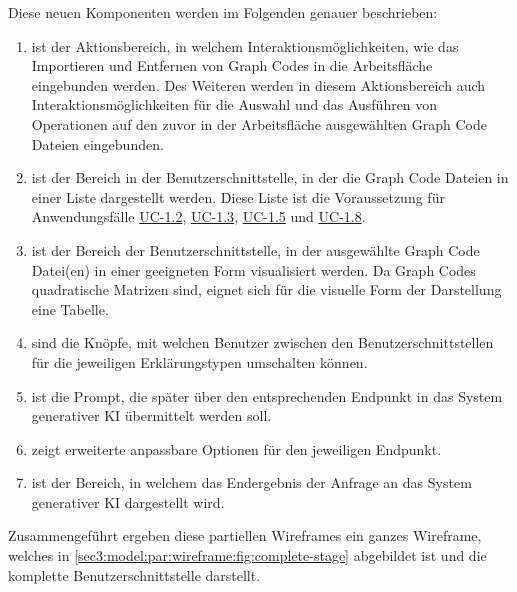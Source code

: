 Diese neuen Komponenten werden im Folgenden genauer beschrieben:
\begin{enumerate}
    \item[\circitem{4}] ist der Aktionsbereich, in welchem Interaktionsmöglichkeiten, wie das Importieren und Entfernen von Graph Codes in die Arbeitsfläche eingebunden werden.
    Des Weiteren werden in diesem Aktionsbereich auch Interaktionsmöglichkeiten für die Auswahl und das Ausführen von Operationen auf den zuvor in der Arbeitsfläche ausgewählten Graph Code Dateien eingebunden.
    \item[\circitem{5}] ist der Bereich in der Benutzerschnittstelle, in der die Graph Code Dateien in einer Liste dargestellt werden.
    Diese Liste ist die Voraussetzung für Anwendungsfälle \hyperref[sec3:model:uc-1.2]{UC-1.2}, \hyperref[sec3:model:uc-1.3]{UC-1.3}, \hyperref[sec3:model:uc-1.5]{UC-1.5} und \hyperref[sec3:model:uc-1.8]{UC-1.8}.
    \item[\circitem{6}] ist der Bereich der Benutzerschnittstelle, in der ausgewählte Graph Code Datei(en) in einer geeigneten Form visualisiert werden.
    Da Graph Codes quadratische Matrizen sind, eignet sich für die visuelle Form der Darstellung eine Tabelle.
    \item[\circitem{7}] sind die Knöpfe, mit welchen Benutzer zwischen den Benutzerschnittstellen für die jeweiligen Erklärungstypen umschalten können.
    \item[\circitem{8}] ist die Prompt, die später über den entsprechenden Endpunkt in das System generativer KI übermittelt werden soll.
    \item[\circitem{9}] zeigt erweiterte anpassbare Optionen für den jeweiligen Endpunkt.
    \item[\circitem{10}] ist der Bereich, in welchem das Endergebnis der Anfrage an das System generativer KI dargestellt wird.
\end{enumerate}
Zusammengeführt ergeben diese partiellen Wireframes ein ganzes Wireframe, welches in \cref{sec3:model:par:wireframe:fig:complete-stage} abgebildet ist und die komplette Benutzerschnittstelle darstellt.

